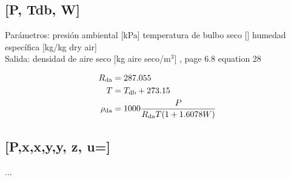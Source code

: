 \documentclass[letterpaper]{article}
\newcommand*\Tdb{\ensuremath{T\sub{db}}}
\newcommand*\Rda{\ensuremath{\rho\sub{da}}}
\begin{document}
\subsection{[P, Tdb, W]}
\noindent Parámetros:
presión ambiental [kPa]
\vardef{\Tdb}temperatura de bulbo seco [\degC]
humedad específica [kg/kg dry air]
\\Salida:
\vardef{\Rda}densidad de aire seco [kg aire seco/$\text{m}^3$]
\ashref, page 6.8 equation 28

\begin{align}
	R\sub{da} &= 287.055 \\
	T &= \Tdb+273.15 \\
	\Rda &= 1000\frac{P}{R\sub{da}T(1+1.6078W)}
\end{align}

\newcommand\tab[1]{\\\rule{#1}{0em}}
\subsection{[P,x,x,y,y, z, u=]}
...
\end{document}
